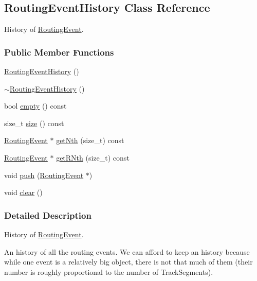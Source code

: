 \hypertarget{classKite_1_1RoutingEventHistory}{}\subsection{Routing\+Event\+History Class Reference}
\label{classKite_1_1RoutingEventHistory}


History of \hyperlink{classKite_1_1RoutingEvent}{Routing\+Event}.  


\subsubsection*{Public Member Functions}
\begin{DoxyCompactItemize}
\item 
\hyperlink{classKite_1_1RoutingEventHistory_af286a3887c4925a37eadc8018d584aa3}{Routing\+Event\+History} ()
\item 
\hyperlink{classKite_1_1RoutingEventHistory_a5a7671b3e27e93b018cf407a7eba9ce7}{$\sim$\+Routing\+Event\+History} ()
\item 
bool \hyperlink{classKite_1_1RoutingEventHistory_a644718bb2fb240de962dc3c9a1fdf0dc}{empty} () const
\item 
size\+\_\+t \hyperlink{classKite_1_1RoutingEventHistory_a259cb5a711406a8c3e5d937eb9350cca}{size} () const
\item 
\hyperlink{classKite_1_1RoutingEvent}{Routing\+Event} $\ast$ \hyperlink{classKite_1_1RoutingEventHistory_a81fbd6a845cb991db9f03f13edb14a50}{get\+Nth} (size\+\_\+t) const
\item 
\hyperlink{classKite_1_1RoutingEvent}{Routing\+Event} $\ast$ \hyperlink{classKite_1_1RoutingEventHistory_abf422c3119f0b121ce124aff979eafff}{get\+R\+Nth} (size\+\_\+t) const
\item 
void \hyperlink{classKite_1_1RoutingEventHistory_ac802427673567526d06af911e94f7216}{push} (\hyperlink{classKite_1_1RoutingEvent}{Routing\+Event} $\ast$)
\item 
void \hyperlink{classKite_1_1RoutingEventHistory_ac8bb3912a3ce86b15842e79d0b421204}{clear} ()
\end{DoxyCompactItemize}


\subsubsection{Detailed Description}
History of \hyperlink{classKite_1_1RoutingEvent}{Routing\+Event}. 

An history of all the routing events. We can afford to keep an history because while one event is a relatively big object, there is not that much of them (their number is roughly proportional to the number of Track\+Segments).

